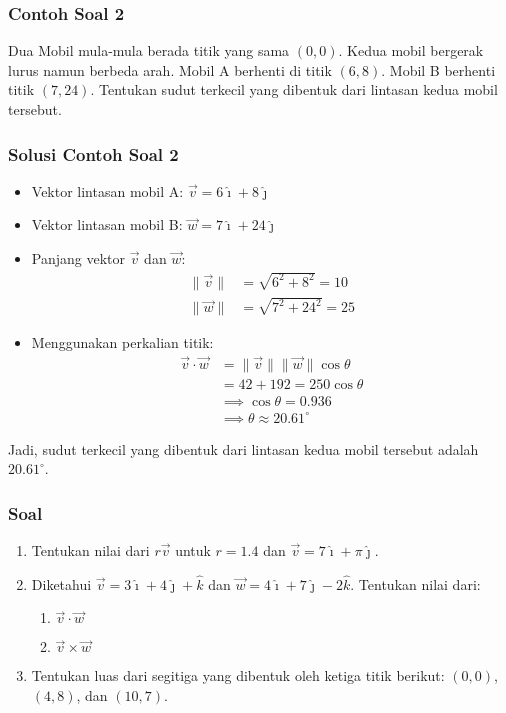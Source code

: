 \documentclass{beamer}
\begin{document}
\begin{frame}
\frametitle{Contoh Soal 2}
Dua Mobil mula-mula berada titik yang sama $(0, 0)$. Kedua mobil bergerak lurus namun berbeda arah. Mobil A berhenti di titik $(6, 8)$. Mobil B berhenti titik $(7, 24)$. Tentukan sudut terkecil yang dibentuk dari lintasan kedua mobil tersebut.
\end{frame}

\begin{frame}
\frametitle{Solusi Contoh Soal 2}
\begin{itemize}
   \item Vektor lintasan mobil A: $\vec{v} = 6\hat{\imath} + 8\hat{\jmath}$
   \item Vektor lintasan mobil B: $\vec{w} = 7\hat{\imath} + 24\hat{\jmath}$
   \item Panjang vektor $\vec{v}$ dan $\vec{w}$:
       \begin{align*}
           \|\vec{v}\| &= \sqrt{6^2 + 8^2} = 10 \\
           \|\vec{w}\| &= \sqrt{7^2 + 24^2} = 25
       \end{align*}
   \item Menggunakan perkalian titik:
       \begin{align*}
           \vec{v} \cdot \vec{w} &= \|\vec{v}\|\|\vec{w}\| \cos\theta \\
                                  &= 42 + 192 = 250 \cos\theta \\
                                  &\implies \cos\theta = 0.936 \\
                                  &\implies \theta \approx 20.61^\circ
       \end{align*}
\end{itemize}
Jadi, sudut terkecil yang dibentuk dari lintasan kedua mobil tersebut adalah $20.61^\circ$.
\end{frame}

\begin{frame}
\frametitle{Soal}
\begin{enumerate}
   \item Tentukan nilai dari $r\vec{v}$ untuk $r = 1.4$ dan $\vec{v} = 7\hat{\imath} + \pi\hat{\jmath}$.
   \item Diketahui $\vec{v} = 3\hat{\imath} + 4\hat{\jmath} + \hat{k}$ dan $\vec{w} = 4\hat{\imath} + 7\hat{\jmath} - 2\hat{k}$. Tentukan nilai dari:
       \begin{enumerate}
           \item $\vec{v} \cdot \vec{w}$
           \item $\vec{v} \times \vec{w}$
       \end{enumerate}
   \item Tentukan luas dari segitiga yang dibentuk oleh ketiga titik berikut: $(0, 0)$, $(4, 8)$, dan $(10, 7)$.
   
   \end{enumerate}
   \end{frame}
   
\end{document}

